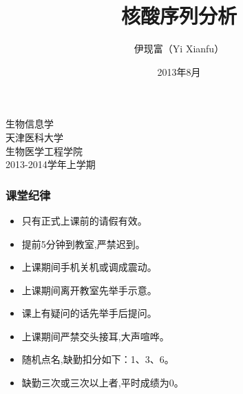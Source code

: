 




\title[核酸序列分析]{核酸序列分析}
\author[Yixf]{伊现富（Yi Xianfu）}
\date{2013年8月}



\begin{frame}[plain]
	\begin{center}
		{\Huge 生物信息学\\}
		\vspace{1cm}
		{\LARGE 天津医科大学\\}
		{\LARGE 生物医学工程学院\\}
		\vspace{1cm}
		{\large 2013-2014学年上学期}
	\end{center}
\end{frame}

\begin{frame}
	\frametitle{课堂纪律}
	\begin{itemize}[<+-|alert@+>]
		\item 只有正式上课前的请假有效。
		\item 提前5分钟到教室,严禁迟到。
		\item 上课期间手机关机或调成震动。
		\item 上课期间离开教室先举手示意。
		\item 课上有疑问的话先举手后提问。
		\item 上课期间严禁交头接耳,大声喧哗。
		\item 随机点名,缺勤扣分如下：1、3、6。
		\item 缺勤三次或三次以上者,平时成绩为0。
	\end{itemize}
\end{frame}

